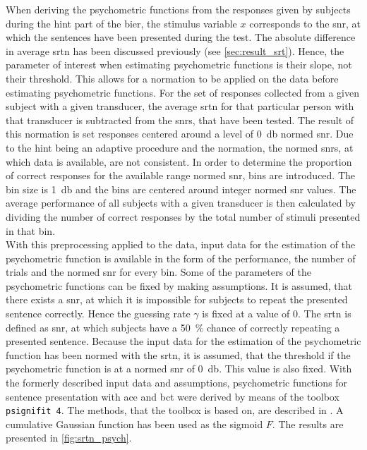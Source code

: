 \stopexplain
When deriving the psychometric functions from the responses given by subjects during the \gls{hint} part of the \gls{bier}, the stimulus variable $x$ corresponds to the \gls{snr}, at which the sentences have been presented during the test.
The absolute difference in average \gls{srtn} has been discussed previously (see \autoref{sec:result_srt}). Hence, the parameter of interest when estimating psychometric functions is their slope, not their threshold.
This allows for a normation to be applied on the data before estimating psychometric functions.
For the set of responses collected from a given subject with a given transducer, the average \gls{srtn} for that particular person with that transducer is subtracted from the \gls{snr}s, that have been tested.
The result of this normation is set responses centered around a level of \SI{0}{\decibel} normed \gls{snr}.
Due to the \gls{hint} being an adaptive procedure and the normation, the normed \gls{snr}s, at which data is available, are not consistent.
In order to determine the proportion of correct responses for the available range normed \gls{snr}, bins are introduced.
The bin size is \SI{1}{\decibel} and the bins are centered around integer normed \gls{snr} values. 
The average performance of all subjects with a given transducer is then calculated by dividing the number of correct responses by the total number of stimuli presented in that bin.\\
With this preprocessing applied to the data, input data for the estimation of the psychometric function is available in the form of the performance, the number of trials and the normed \gls{snr} for every bin.
Some of the parameters of the psychometric functions can be fixed by making assumptions. It is assumed, that there exists a \gls{snr}, at which it is impossible for subjects to repeat the presented sentence correctly. Hence the guessing rate $\gamma$ is fixed at a value of 0.
The \gls{srtn} is defined as \gls{snr}, at which subjects have a \SI{50}{\percent} chance of correctly repeating a presented sentence. Because the input data for the estimation of the psychometric function has been normed with the \gls{srtn}, it is assumed, that the threshold if the psychometric function is at a normed \gls{snr} of \SI{0}{\decibel}. This value is also fixed. 
With the formerly described input data and assumptions, psychometric functions for sentence presentation with \gls{ace} and \gls{bct} were derived by means of the \matlab toolbox \texttt{psignifit 4}. The methods, that the toolbox is based on, are described in \citep{schuett_16}. A cumulative Gaussian function has been used as the sigmoid $F$.
The results are presented in \autoref{fig:srtn_psych}.



